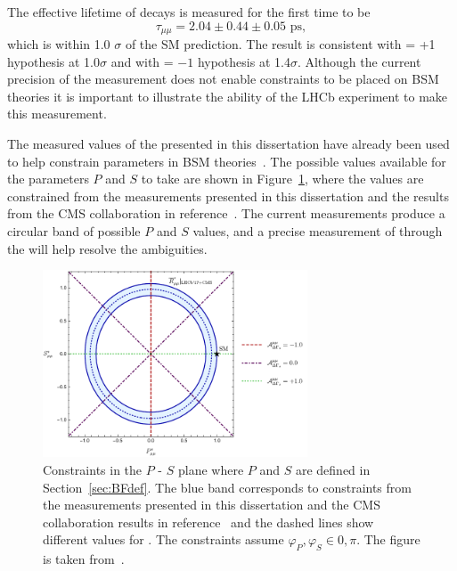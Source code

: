 The effective lifetime of \bsmumu decays is measured for the first time to be 
\begin{equation}
\tau_{\mu\mu} = 2.04 \pm 0.44 \pm 0.05 \text{ ps},
\end{equation}
which is within 1.0 $\sigma$ of the SM prediction. The result is consistent with \ADG = +1 hypothesis at 1.0$\sigma$ and with \ADG = $-1$ hypothesis at 1.4$\sigma$. Although the current precision of the measurement does not enable constraints to be placed on BSM theories it is important to illustrate the ability of the LHCb experiment to make this measurement.

The measured values of the \BF presented in this dissertation have already been used to help constrain parameters in BSM theories~\cite{Altmannshofer:2017wqy,Fleischer:2017ltw,Bobeth:2017xry,Chiang:2017etj}. 
The possible values available for the parameters $P$ and $S$ to take are shown in Figure~\ref{fig:NPcontss}, where the values are constrained from the measurements presented in this dissertation and the results from the CMS collaboration in reference~\cite{Chatrchyan:2013bka}. The current measurements produce a circular band of possible $P$ and $S$ values, and a precise measurement of \ADG through the \bsmumu \el will help resolve the ambiguities.


\begin{figure}[tbp]
    \centering
        \includegraphics[width=0.7\textwidth]{./Figs/Summary/fig3.pdf}
    \caption{Constraints in the $P$ - $S$ plane where $P$ and $S$ are defined in Section~\ref{sec:BFdef}. The blue band corresponds to constraints from the \bmumu \BF measurements presented in this dissertation and the CMS collaboration results in reference~\cite{Chatrchyan:2013bka} and the dashed lines show different values for \ADG. The constraints assume $\varphi_{P}, \varphi_{S}\in {0, \pi}$. The figure is taken from~\cite{Fleischer:2017ltw}.}
    \label{fig:NPcontss}
\end{figure}


